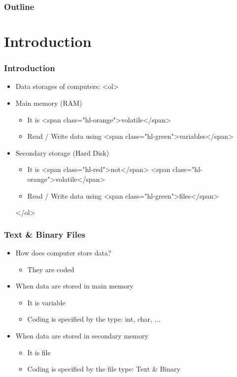 \documentclass{../c-lecture}
\subtitle{Files}
\begin{document}
\begin{frame}
  \titlepage{}
\end{frame}
\begin{frame}
  \frametitle{Outline}
  \tableofcontents{}
\end{frame}

\section{Introduction}

\begin{frame}
  \frametitle{Introduction}
  \begin{itemize}
    \item Data storages of computers:
    <ol>
      \item Main memory (RAM)
      \begin{itemize}
        \item It is <span class="hl-orange">volatile</span>
        \item Read / Write data using <span class="hl-green">variables</span>
      \end{itemize}
      \item Secondary storage (Hard Disk)
      \begin{itemize}
        \item
          It is <span class="hl-red">not</span>
          <span class="hl-orange">volatile</span>

        \item Read / Write data using <span class="hl-green">files</span>
      \end{itemize}
    </ol>
  \end{itemize}
\end{frame}

\begin{frame}
  \frametitle{Text \& Binary Files}
  \begin{itemize}
    \item How does computer store data?
    \begin{itemize}
      \item They are coded
    \end{itemize}
    \item When data are stored in main memory
    \begin{itemize}
      \item It is variable
      \item Coding is specified by the type: int, char, ...
    \end{itemize}
    \item When data are stored in secondary memory
    \begin{itemize}
      \item It is file
      \item Coding is specified by the file type: Text \& Binary
    \end{itemize}
  \end{itemize}
\end{frame}
\end{document}
